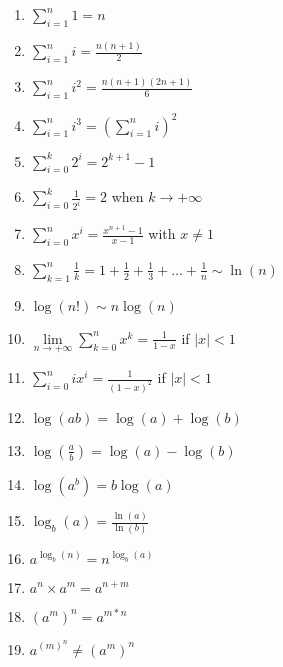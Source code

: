 \begin{enumerate}
    \item \(\sum_{i=1}^{n} 1 = n\)
    \vspace{0.15cm}
    \item \(\sum_{i=1}^{n} i = \frac{n(n+1)}{2}\)
    \vspace{0.15cm}
    \item \(\sum_{i=1}^{n} i^2 = \frac{n(n+1)(2n+1)}{6}\)
    \vspace{0.15cm}
    \item \(\sum_{i=1}^{n} i^3 =  (\sum_{i=1}^{n} i)^2  \)
    \vspace{0.15cm}
    \item \(\sum_{i=0}^{k} 2^i =  2^{k+1} - 1  \)
    \vspace{0.15cm}
    \item \(\sum_{i=0}^{k} \frac{1}{2^i} =  2\)\hspace{0.15cm} when \(k \to +\infty\)
    \vspace{0.15cm}
    \item \(\sum_{i=0}^{n} x^i =  \frac{x^{n+1}-1}{x-1}\)\hspace{0.15cm} with \(x \neq 1\)
    \vspace{0.15cm}
    \item \(\sum_{k=1}^{n} \frac{1}{k} =  1+\frac{1}{2}+\frac{1}{3}+\dots+\frac{1}{n} \sim \ln(n) \)
    \vspace{0.15cm}
    \item \(\log(n!) \sim n\log(n)\)
    \vspace{0.15cm}
    \item \(\lim\limits_{n\to +\infty} \sum_{k = 0}^n x^k  = \frac{1}{1-x}\)\hspace{0.15cm} if \(|x| < 1\) 
    \vspace{0.15cm}                                                                    
    \item \(\sum_{i = 0}^n ix^i  = \frac{1}{(1-x)^2}\)\hspace{0.15cm} if \(|x| < 1\) 
    \vspace{0.15cm}
    \item \(\log(ab) = \log(a) + \log(b)\)
    \vspace{0.15cm}
    \item \(\log(\frac{a}{b}) = \log(a) - \log(b)\) 
    \vspace{0.15cm}
    \item \(\log(a^b) = b\log(a)\)
    \vspace{0.15cm}
    \item \(\log_b(a) = \frac{\ln(a)}{\ln(b)}\) 
    \vspace{0.15cm}
    \item \(a^{\log_b(n)} = n^{\log_b(a)}\) 
    \vspace{0.15cm}
    \item \(a^n\times a^m = a^{n+m}\)
    \vspace{0.15cm}
    \item \((a^m)^n = a^{m*n}\)
    \vspace{0.15cm}
\item \(a^{(m)^{n}} \neq (a^{m})^n\)
\end{enumerate}

